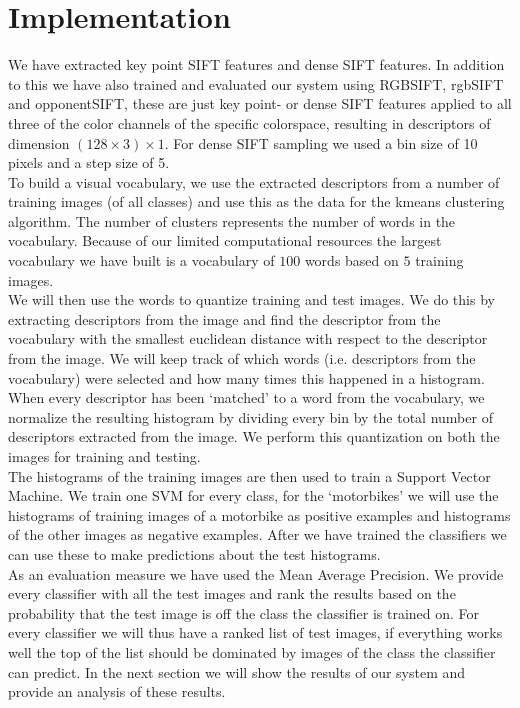 \documentclass[11pt]{article}
\begin{document}
\section{Implementation}
We have extracted key point SIFT features and dense SIFT features. In addition to this we have also trained and evaluated our system using RGBSIFT, rgbSIFT and opponentSIFT, these are just key point- or dense SIFT features applied to all three of the color channels of the specific colorspace, resulting in descriptors of dimension $(128\times3)\times1$. For dense SIFT sampling we used a bin size of 10 pixels and a step size of 5. \\
To build a visual vocabulary, we use the extracted descriptors from a number of training images (of all classes) and use this as the data for the kmeans clustering algorithm. The number of clusters represents the number of words in the vocabulary. Because of our limited computational resources the largest vocabulary we have built is a vocabulary of $100$ words based on $5$ training images. \\
We will then use the words to quantize training and test images. We do this by extracting descriptors from the image and find the descriptor from the vocabulary with the smallest euclidean distance with respect to the descriptor from the image. We will keep track of which words (i.e. descriptors from the vocabulary) were selected and how many times this happened in a histogram. When every descriptor has been `matched' to a word from the vocabulary, we normalize the resulting histogram by dividing every bin by the total number of descriptors extracted from the image. We perform this quantization on both the images for training and testing. \\
The histograms of the training images are then used to train a Support Vector Machine. We train one SVM for every class, for the `motorbikes' we will use the histograms of training images of a motorbike as positive examples and histograms of the other images as negative examples. After we have trained the classifiers we can use these to make predictions about the test histograms.\\
As an evaluation measure we have used the Mean Average Precision. We provide every classifier with all the test images and rank the results based on the probability that the test image is off the class the classifier is trained on. For every classifier we will thus have a ranked list of test images, if everything works well the top of the list should be dominated by images of the class the classifier can predict. In the next section we will show the results of our system and provide an analysis of these results. 
\end{document}
